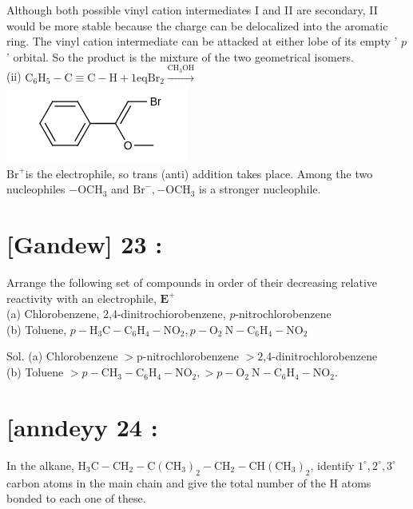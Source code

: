 \documentclass[10pt]{article}
\begin{document}
Although both possible vinyl cation intermediates I and II are secondary, II would be more stable because the charge can be delocalized into the aromatic ring. The vinyl cation intermediate can be attacked at either lobe of its empty ' $p$ ' orbital. So the product is the mixture of the two geometrical isomers.\\
(ii) $\mathrm{C}_{6} \mathrm{H}_{5}-\mathrm{C} \equiv \mathrm{C}-\mathrm{H}+1 \mathrm{eq} \mathrm{Br}_{2} \xrightarrow{\mathrm{CH}_{3} \mathrm{OH}}$\\
\includegraphics{smile-2fa44bd207cbbe8476207c079a88d3da6dbcec8b}\\
$\mathrm{Br}^{+}$is the electrophile, so trans (anti) addition takes place. Among the two nucleophiles $-\mathrm{OCH}_{3}$ and $\mathrm{Br}^{-},-\mathrm{OCH}_{3}$ is a stronger nucleophile.

\section*{[Gandew] 23 :}
Arrange the following set of compounds in order of their decreasing relative reactivity with an electrophile, $\mathbf{E}^{+}$\\
(a) Chlorobenzene, 2,4-dinitrochiorobenzene, $p$-nitrochlorobenzene\\
(b) Toluene, $p-\mathrm{H}_{3} \mathrm{C}-\mathrm{C}_{6} \mathrm{H}_{4}-\mathrm{NO}_{2}, p-\mathrm{O}_{2} \mathrm{~N}-\mathrm{C}_{6} \mathrm{H}_{4}-\mathrm{NO}_{2}$

Sol. (a) Chlorobenzene $>\mathrm{p}$-nitrochlorobenzene $>2$,4-dinitrochlorobenzene\\
(b) Toluene $>p-\mathrm{CH}_{3}-\mathrm{C}_{6} \mathrm{H}_{4}-\mathrm{NO}_{2},>p-\mathrm{O}_{2} \mathrm{~N}-\mathrm{C}_{6} \mathrm{H}_{4}-\mathrm{NO}_{2}$.

\section*{[anndeyy 24 :}
In the alkane, $\mathrm{H}_{3} \mathrm{C}-\mathrm{CH}_{2}-\mathrm{C}\left(\mathrm{CH}_{3}\right)_{2}-\mathrm{CH}_{2}-\mathrm{CH}\left(\mathrm{CH}_{3}\right)_{2}$, identify $1^{\circ}, 2^{\circ}, 3^{\circ}$ carbon atoms in the main chain and give the total number of the H atoms bonded to each one of these.
\end{document}

